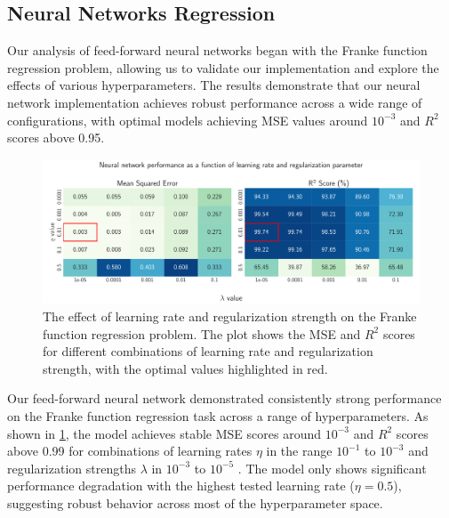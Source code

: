 \documentclass[aps,pra,english,notitlepage,reprint,nofootinbib]{revtex4-1}  %
\begin{document}
\subsection{Neural Networks Regression}

Our analysis of feed-forward neural networks began with the Franke function regression problem, allowing us to validate our implementation and explore the effects of various hyperparameters. The results demonstrate that our neural network implementation achieves robust performance across a wide range of configurations, with optimal models achieving MSE values around \( 10^{-3} \) and \( R^2 \) scores above 0.95.

\onecolumngrid
\begin{figure}[h!]
    \centering
    \includegraphics[width = .9\textwidth]{../figs/c_eta_lambda.pdf}
    \caption{The effect of learning rate and regularization strength on the Franke function regression problem. The plot shows the MSE and \( R^2 \) scores for different combinations of learning rate and regularization strength, with the optimal values highlighted in red.}
    \label{fig:NN_Franke_eta_lambda}
\end{figure}
\twocolumngrid

Our feed-forward neural network demonstrated consistently strong performance on the Franke function regression task across a range of hyperparameters. As shown in \cref{fig:NN_Franke_eta_lambda}, the model achieves stable MSE scores around $10^{-3}$ and $R^2$ scores above 0.99 for combinations of learning rates $ \eta $ in the range $ 10^{-1} $ to $ 10^{-3}$ and regularization strengths $ \lambda $ in $ 10^{-3} $ to $ 10^{-5}$ . The model only shows significant performance degradation with the highest tested learning rate ($\eta = 0.5$), suggesting robust behavior across most of the hyperparameter space.
\end{document}
